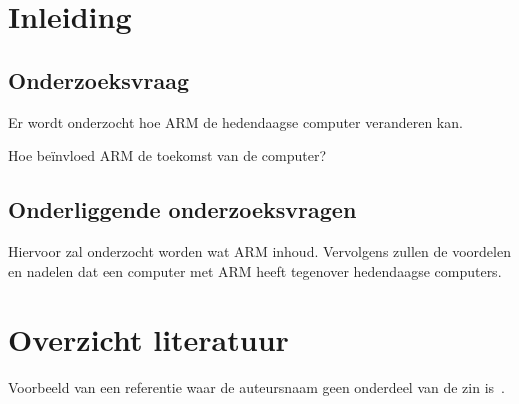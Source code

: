 \documentclass{hogent-article}
\affiliation{
    \textsuperscript{1} \href{mailto:jona.deneve.@student.hogent.be}{jona.deneve.@student.hogent.be}
}
\begin{document}
\flushbottom %
\maketitle %
\tableofcontents %
\thispagestyle{empty} %


\section{Inleiding}


\subsection{Onderzoeksvraag}

Er wordt onderzocht hoe ARM de hedendaagse computer veranderen kan.

Hoe beïnvloed ARM de toekomst van de computer?


\subsection{Onderliggende onderzoeksvragen}

Hiervoor zal onderzocht worden wat ARM inhoud. Vervolgens zullen de voordelen en nadelen dat een computer met ARM heeft tegenover hedendaagse computers.



\section{Overzicht literatuur}


Voorbeeld van een referentie waar de auteursnaam geen onderdeel van de zin is~\autocite{Moore2002}.
\end{document}
